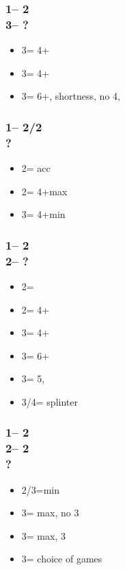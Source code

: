 \documentclass[12pt, a4paper]{article}
\begin{document}
\subsubsection*{1\nt -- 2\clubs\\
                3\clubs -- ?}
\begin{itemize}
    \item 3\diams = 4+\hearts
    \item 3\hearts = 4+\spades
    \item 3\spades = 6+\diams, \clubs shortness, no 4\major, \gf
\end{itemize}

\subsubsection*{1\nt -- 2\diams/2\hearts\\
                ?}
\begin{itemize}
    \item 2\major = acc
    \item 2\nt = 4+\major max
    \item 3\major = 4+\major min
\end{itemize}

\subsubsection*{1\nt -- 2\diams\\
                2\hearts -- ?}
\begin{itemize}
    \item 2\spades = \inv
    \item 2\nt = 4+\clubs\ \gf
    \item 3\clubs = 4+\diams \gf
    \item 3\diams = 6+\hearts \gf
    \item 3\hearts = 5\spades, \inv
    \item 3\spades/4\minor = splinter
\end{itemize}

\subsubsection*{1\nt -- 2\diams\\
                2\hearts -- 2\spades\\
                ?}
\begin{itemize}
    \item 2\nt/3\hearts =min
    \item 3\clubs = max, no 3\hearts
    \item 3\diams = max, 3\hearts
    \item 3\nt = choice of games
\end{itemize}
\end{document}
